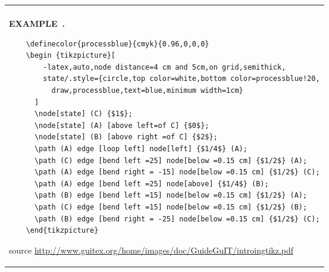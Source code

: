 \documentclass{article}
\newcounter{example}[section]
\newenvironment{example}[1][]{\refstepcounter{example}\par\medskip
  \begin{tabular}{|p{\textwidth}|}\hline\\{\bf EXAMPLE~\theexample. #1}}{\\\hline \end{tabular}}
\begin{document}
\begin{example}
  \begin{center}

    \begin {tikzpicture}[
        -latex,auto,node distance =4 cm and 5cm,on grid,semithick,
        state/.style={circle,top color=white,bottom color=processblue!20,
          draw,processblue,text=blue,minimum width=1cm}
      ]
      \node[state] (C) {$1$};
      \node[state] (A) [above left=of C] {$0$};
      \node[state] (B) [above right =of C] {$2$};
      \path (A) edge [loop left] node[left] {$1/4$} (A);
      \path (C) edge [bend left =25] node[below =0.15 cm] {$1/2$} (A);
      \path (A) edge [bend right = -15] node[below =0.15 cm] {$1/2$} (C);
      \path (A) edge [bend left =25] node[above] {$1/4$} (B);
      \path (B) edge [bend left =15] node[below =0.15 cm] {$1/2$} (A);
      \path (C) edge [bend left =15] node[below =0.15 cm] {$1/2$} (B);
      \path (B) edge [bend right = -25] node[below =0.15 cm] {$1/2$} (C);
    \end{tikzpicture}

  \end{center}

    {\small 
    \begin{verbatim}
    \definecolor{processblue}{cmyk}{0.96,0,0,0}
    \begin {tikzpicture}[
        -latex,auto,node distance=4 cm and 5cm,on grid,semithick,
        state/.style={circle,top color=white,bottom color=processblue!20,
          draw,processblue,text=blue,minimum width=1cm}
      ]
      \node[state] (C) {$1$};
      \node[state] (A) [above left=of C] {$0$};
      \node[state] (B) [above right =of C] {$2$};
      \path (A) edge [loop left] node[left] {$1/4$} (A);
      \path (C) edge [bend left =25] node[below =0.15 cm] {$1/2$} (A);
      \path (A) edge [bend right = -15] node[below =0.15 cm] {$1/2$} (C);
      \path (A) edge [bend left =25] node[above] {$1/4$} (B);
      \path (B) edge [bend left =15] node[below =0.15 cm] {$1/2$} (A);
      \path (C) edge [bend left =15] node[below =0.15 cm] {$1/2$} (B);
      \path (B) edge [bend right = -25] node[below =0.15 cm] {$1/2$} (C);
    \end{tikzpicture}
    \end{verbatim}
    }

  source \url{http://www.guitex.org/home/images/doc/GuideGuIT/introingtikz.pdf}
\end{example}
\end{document}
